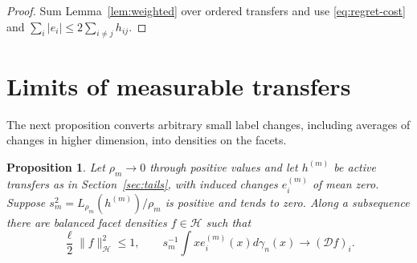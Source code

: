 \documentclass[11pt,reqno]{amsart}
\newtheorem{proposition}[theorem]{Proposition}
\newcommand{\norm}[1]{\lVert #1\rVert}
\newcommand{\ga}{\gamma}
\newcommand{\HH}{\mathcal H}
\newcommand{\DD}{\mathcal D}
\begin{document}
\begin{proof}
Sum Lemma~\ref{lem:weighted} over ordered transfers and use
\eqref{eq:regret-cost} and $\sum_i|e_i|\le2\sum_{i\ne j}h_{ij}$.
\end{proof}

\section{Limits of measurable transfers}\label{sec:compactness}

The next proposition converts arbitrary small label changes, including
averages of changes in higher dimension, into densities on the facets.

\begin{proposition}\label{prop:compactness}
Let $\rho_m\to0$ through positive values and let $h^{(m)}$ be active
transfers as in Section~\ref{sec:tails}, with induced changes
$e_i^{(m)}$ of mean zero. Suppose $s_m^2=L_{\rho_m}(h^{(m)})/\rho_m$
is positive and tends to zero. Along a subsequence there are balanced
facet densities $f\in\HH$ such that
\[
 \frac{\ell}{2}\norm f_\HH^2\le1,\qquad
 s_m^{-1}\int x e_i^{(m)}(x)d\ga_n(x)\longrightarrow(\DD f)_i.
\]
\end{proposition}
\end{document}
